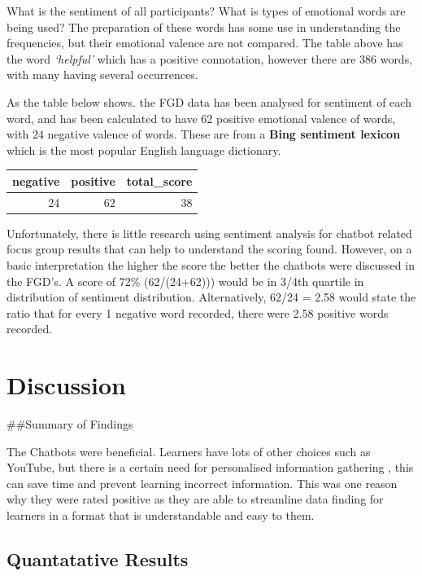 \documentclass[a4paper, nobind]{templates/ociamthesis}
\begin{document}
What is the sentiment of all participants? What is types of emotional
words are being used? The preparation of these words has some use in
understanding the frequencies, but their emotional valence are not
compared. The table above has the word \emph{`helpful'} which has a positive
connotation, however there are 386 words, with many having several
occurrences.

As the table below shows. the FGD data has been analysed for sentiment
of each word, and has been calculated to have 62 positive emotional
valence of words, with 24 negative valence of words. These are from a
\textbf{Bing sentiment lexicon} which is the most popular English language
dictionary.

\begin{tabular}{r|r|r}
\hline
negative & positive & total\_score\\
\hline
24 & 62 & 38\\
\hline
\end{tabular}

Unfortunately, there is little research using sentiment analysis for
chatbot related focus group results that can help to understand the
scoring found. However, on a basic interpretation the higher the score
the better the chatbots were discussed in the FGD's. A score of 72\%
(62/(24+62))) would be in 3/4th quartile in distribution of sentiment
distribution. Alternatively, 62/24 = 2.58 would state the ratio that for
every 1 negative word recorded, there were 2.58 positive words recorded.

\hypertarget{Discussion}{%
\chapter{Discussion}\label{Discussion}}

\minitoc 

\#\#Summary of Findings

The Chatbots were beneficial. Learners have lots of other choices such as YouTube, but there is a certain need for personalised information gathering , this can save time and prevent learning incorrect information. This was one reason why they were rated positive as they are able to streamline data finding for learners in a format that is understandable and easy to them.

\hypertarget{quantatative-results}{%
\section{Quantatative Results}\label{quantatative-results}}
\end{document}
